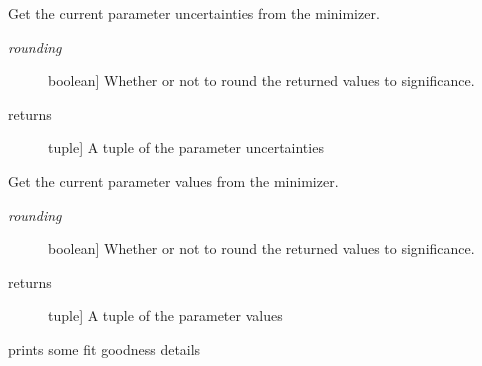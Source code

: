 \documentclass[letterpaper,10pt,english]{sphinxmanual}
\begin{document}
\begin{fulllineitems}
\begin{fulllineitems}
\begin{description}
\end{description}

\end{fulllineitems}


\begin{fulllineitems}
\label{api/kafe:kafe.fit.Fit.get_parameter_errors}
Get the current parameter uncertainties from the minimizer.
\begin{description}
\item[{\emph{rounding}}] \leavevmode{[}boolean{]}
Whether or not to round the returned values to significance.

\item[{returns}] \leavevmode{[}tuple{]}
A tuple of the parameter uncertainties

\end{description}

\end{fulllineitems}


\begin{fulllineitems}
\label{api/kafe:kafe.fit.Fit.get_parameter_values}
Get the current parameter values from the minimizer.
\begin{description}
\item[{\emph{rounding}}] \leavevmode{[}boolean{]}
Whether or not to round the returned values to significance.

\item[{returns}] \leavevmode{[}tuple{]}
A tuple of the parameter values

\end{description}

\end{fulllineitems}


\begin{fulllineitems}
\label{api/kafe:kafe.fit.Fit.print_fit_details}
prints some fit goodness details

\end{fulllineitems}



\end{fulllineitems}
\end{document}
